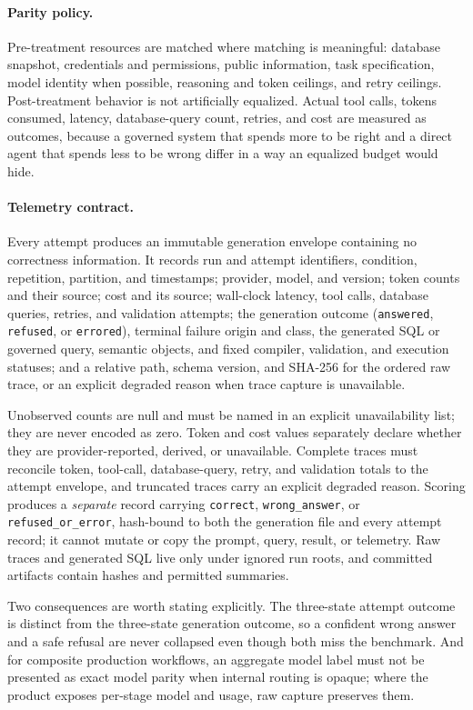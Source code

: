 \paragraph{Parity policy.}
Pre-treatment resources are matched where matching is meaningful: database
snapshot, credentials and permissions, public information, task specification,
model identity when possible, reasoning and token ceilings, and retry ceilings.
Post-treatment behavior is not artificially equalized. Actual tool calls, tokens
consumed, latency, database-query count, retries, and cost are measured as
outcomes, because a governed system that spends more to be right and a direct
agent that spends less to be wrong differ in a way an equalized budget would
hide.

\paragraph{Telemetry contract.}
Every attempt produces an immutable generation envelope containing no correctness
information. It records run and attempt identifiers, condition, repetition,
partition, and timestamps; provider, model, and version; token counts and their
source; cost and its source; wall-clock latency, tool calls, database queries,
retries, and validation attempts; the generation outcome
(\texttt{answered}, \texttt{refused}, or \texttt{errored}), terminal failure
origin and class, the generated SQL or governed query, semantic objects, and
fixed compiler, validation, and execution statuses; and a relative path, schema
version, and SHA-256 for the ordered raw trace, or an explicit degraded reason
when trace capture is unavailable.

Unobserved counts are null and must be named in an explicit unavailability list;
they are never encoded as zero. Token and cost values separately declare whether
they are provider-reported, derived, or unavailable. Complete traces must
reconcile token, tool-call, database-query, retry, and validation totals to the
attempt envelope, and truncated traces carry an explicit degraded reason. Scoring
produces a \emph{separate} record carrying \texttt{correct},
\texttt{wrong\_answer}, or \texttt{refused\_or\_error}, hash-bound to both the
generation file and every attempt record; it cannot mutate or copy the prompt,
query, result, or telemetry. Raw traces and generated SQL live only under ignored
run roots, and committed artifacts contain hashes and permitted summaries.

Two consequences are worth stating explicitly. The three-state attempt outcome is
distinct from the three-state generation outcome, so a confident wrong answer and
a safe refusal are never collapsed even though both miss the benchmark. And for
composite production workflows, an aggregate model label must not be presented as
exact model parity when internal routing is opaque; where the product exposes
per-stage model and usage, raw capture preserves them.

